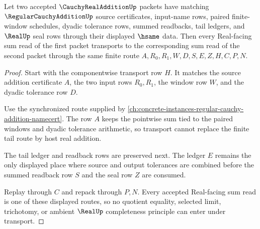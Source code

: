 \begin{theorem}
\label{thm:cauchy-real-addition-tail-stability}
Let two accepted $\CauchyRealAdditionUp$ packets have matching $\RegularCauchyAdditionUp$ source certificates, input-name rows, paired finite-window schedules, dyadic tolerance rows, summed readbacks, tail ledgers, and $\RealUp$ seal rows through their displayed $\hsame$ data. Then every Real-facing sum read of the first packet transports to the corresponding sum read of the second packet through the same finite route $A,R_0,R_1,W,D,S,E,Z,H,C,P,N$.
\end{theorem}
\begin{proof}
Start with the componentwise transport row $H$. It matches the source addition certificate $A$, the two input rows $R_0,R_1$, the window row $W$, and the dyadic tolerance row $D$.

Use the synchronized route supplied by \autoref{ch:concrete-instances-regular-cauchy-addition-namecert}. The row $A$ keeps the pointwise sum tied to the paired windows and dyadic tolerance arithmetic, so transport cannot replace the finite tail route by host real addition.

The tail ledger and readback rows are preserved next. The ledger $E$ remains the only displayed place where source and output tolerances are combined before the summed readback row $S$ and the seal row $Z$ are consumed.

Replay through $C$ and repack through $P,N$. Every accepted Real-facing sum read is one of these displayed routes, so no quotient equality, selected limit, trichotomy, or ambient $\RealUp$ completeness principle can enter under transport.
\end{proof}

